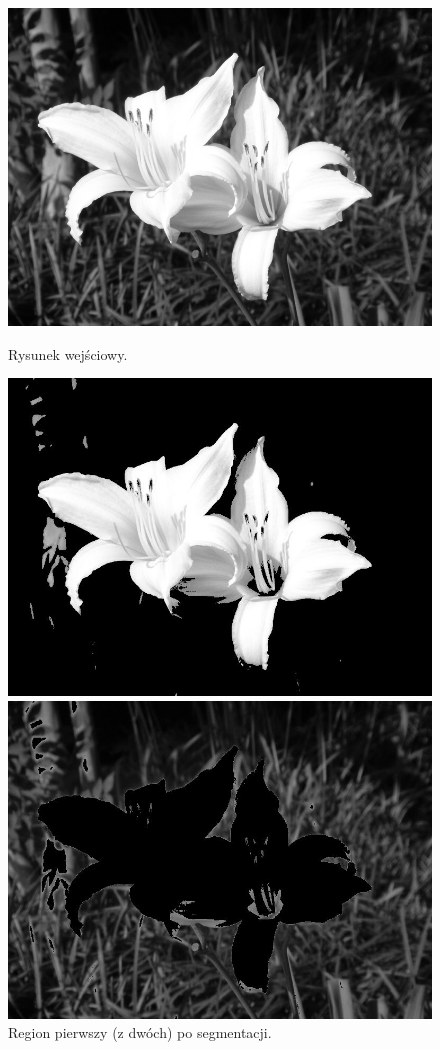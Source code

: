 \documentclass[10pt]{llncs}
\begin{document}
\begin{figure}[!htb]
  \includegraphics[width=\linewidth]{img/01.jpg}
  \caption{Rysunek wejściowy.}\label{fig:1}
\endminipage\hfill
{}
  \includegraphics[width=\linewidth]{img/01_region_01.jpg}
  \caption{Region pierwszy (z dwóch) po segmentacji.}\label{fig:2}
\endminipage\hfill
{}
  \includegraphics[width=\linewidth]{img/01_region_02.jpg}

\end{figure}
\end{document}
